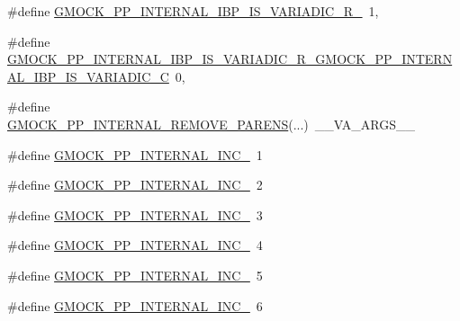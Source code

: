 \begin{DoxyCompactItemize}
\item 
\#define \mbox{\hyperlink{_obj__test_2lib_2googletest-master_2googlemock_2include_2gmock_2internal_2gmock-pp_8h_a80e10be13b34c05a5bc4a2db66f6090e}{G\+M\+O\+C\+K\+\_\+\+P\+P\+\_\+\+I\+N\+T\+E\+R\+N\+A\+L\+\_\+\+I\+B\+P\+\_\+\+I\+S\+\_\+\+V\+A\+R\+I\+A\+D\+I\+C\+\_\+\+R\+\_}}~1,
\item 
\#define \mbox{\hyperlink{_obj__test_2lib_2googletest-master_2googlemock_2include_2gmock_2internal_2gmock-pp_8h_a0415d68018422fd678c14c84e2390142}{G\+M\+O\+C\+K\+\_\+\+P\+P\+\_\+\+I\+N\+T\+E\+R\+N\+A\+L\+\_\+\+I\+B\+P\+\_\+\+I\+S\+\_\+\+V\+A\+R\+I\+A\+D\+I\+C\+\_\+\+R\+\_\+\+G\+M\+O\+C\+K\+\_\+\+P\+P\+\_\+\+I\+N\+T\+E\+R\+N\+A\+L\+\_\+\+I\+B\+P\+\_\+\+I\+S\+\_\+\+V\+A\+R\+I\+A\+D\+I\+C\+\_\+C}}~0,
\item 
\#define \mbox{\hyperlink{_obj__test_2lib_2googletest-master_2googlemock_2include_2gmock_2internal_2gmock-pp_8h_ac3c1fba05dad44080330c0ecd1208ca6}{G\+M\+O\+C\+K\+\_\+\+P\+P\+\_\+\+I\+N\+T\+E\+R\+N\+A\+L\+\_\+\+R\+E\+M\+O\+V\+E\+\_\+\+P\+A\+R\+E\+NS}}(...)~\+\_\+\+\_\+\+V\+A\+\_\+\+A\+R\+G\+S\+\_\+\+\_\+
\item 
\#define \mbox{\hyperlink{_obj__test_2lib_2googletest-master_2googlemock_2include_2gmock_2internal_2gmock-pp_8h_a67c3172a9b55aca4445d8399a27d7bb3}{G\+M\+O\+C\+K\+\_\+\+P\+P\+\_\+\+I\+N\+T\+E\+R\+N\+A\+L\+\_\+\+I\+N\+C\+\_}}~1
\item 
\#define \mbox{\hyperlink{_obj__test_2lib_2googletest-master_2googlemock_2include_2gmock_2internal_2gmock-pp_8h_a5c8d218b722f86a9f6b1af37075abba0}{G\+M\+O\+C\+K\+\_\+\+P\+P\+\_\+\+I\+N\+T\+E\+R\+N\+A\+L\+\_\+\+I\+N\+C\+\_}}~2
\item 
\#define \mbox{\hyperlink{_obj__test_2lib_2googletest-master_2googlemock_2include_2gmock_2internal_2gmock-pp_8h_a56f097ec235d0c099596397429130b5f}{G\+M\+O\+C\+K\+\_\+\+P\+P\+\_\+\+I\+N\+T\+E\+R\+N\+A\+L\+\_\+\+I\+N\+C\+\_}}~3
\item 
\#define \mbox{\hyperlink{_obj__test_2lib_2googletest-master_2googlemock_2include_2gmock_2internal_2gmock-pp_8h_a0208ca2062b923cd12255f68d18f9e46}{G\+M\+O\+C\+K\+\_\+\+P\+P\+\_\+\+I\+N\+T\+E\+R\+N\+A\+L\+\_\+\+I\+N\+C\+\_}}~4
\item 
\#define \mbox{\hyperlink{_obj__test_2lib_2googletest-master_2googlemock_2include_2gmock_2internal_2gmock-pp_8h_a513e563d704ca901b696d367ed28ed63}{G\+M\+O\+C\+K\+\_\+\+P\+P\+\_\+\+I\+N\+T\+E\+R\+N\+A\+L\+\_\+\+I\+N\+C\+\_}}~5
\item 
\#define \mbox{\hyperlink{_obj__test_2lib_2googletest-master_2googlemock_2include_2gmock_2internal_2gmock-pp_8h_a5a1c4a56fb224e8b8453a28f2798a2ec}{G\+M\+O\+C\+K\+\_\+\+P\+P\+\_\+\+I\+N\+T\+E\+R\+N\+A\+L\+\_\+\+I\+N\+C\+\_}}~6

\end{DoxyCompactItemize}
